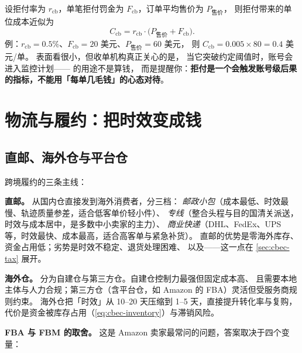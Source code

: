\begin{formulacard}[拒付率的成本换算]
设拒付率为 $r_{\text{cb}}$，单笔拒付罚金为 $F_{\text{cb}}$，订单平均售价为 $P_{\text{售价}}$，
则拒付带来的单位成本近似为
\begin{equation}
C_{\text{cb}} = r_{\text{cb}} \cdot \bigl(P_{\text{售价}} + F_{\text{cb}}\bigr) .
\label{eq:cbec-chargeback}
\end{equation}
例：$r_{\text{cb}} = 0.5\%$、$F_{\text{cb}} = 20$ 美元、$P_{\text{售价}} = 60$ 美元，
则 $C_{\text{cb}} = 0.005 \times 80 = 0.4$ 美元/单。
表面看很小，但收单机构真正关心的是，
当它突破约定阈值时，账号会进入监控计划—— 的用途不是算钱，
而是提醒你：\textbf{拒付是一个会触发账号级后果的指标，不能用「每单几毛钱」的心态对待}。
\end{formulacard}

\section{物流与履约：把时效变成钱}
\label{sec:cbec-logistics}

\subsection{直邮、海外仓与平台仓}

跨境履约的三条主线：

\textbf{直邮。} 从国内仓直接发到海外消费者，分三档：
\emph{邮政小包}（成本最低、时效最慢、轨迹质量参差，适合低客单价轻小件）、
\emph{专线}（整合头程与目的国清关派送，时效与成本居中，是多数中小卖家的主力）、
\emph{商业快递}（DHL、FedEx、UPS 等，时效最快、成本最高，适合高客单与紧急补货）。
直邮的优势是零海外库存、资金占用低；劣势是时效不稳定、退货处理困难、
以及——这一点在 \cref{sec:cbec-tax} 展开。

\textbf{海外仓。} 分为自建仓与第三方仓。自建仓控制力最强但固定成本高、
且需要本地主体与人力合规；第三方仓（含平台仓，如 Amazon 的 FBA）灵活但受服务商规则约束。
海外仓把「时效」从 10--20 天压缩到 1--5 天，直接提升转化率与复购，
代价是资金被库存占用（\cref{eq:cbec-inventory}）与滞销风险。

\textbf{FBA 与 FBM 的取舍。} 这是 Amazon 卖家最常问的问题，答案取决于四个变量：

